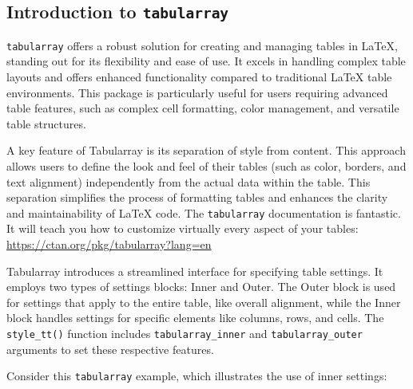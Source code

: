 \documentclass[
  letterpaper,
  DIV=11,
  numbers=noendperiod]{scrartcl}
\begin{document}
\subsection{\texorpdfstring{Introduction to
\texttt{tabularray}}{Introduction to tabularray}}\label{introduction-to-tabularray}

\texttt{tabularray} offers a robust solution for creating and managing
tables in LaTeX, standing out for its flexibility and ease of use. It
excels in handling complex table layouts and offers enhanced
functionality compared to traditional LaTeX table environments. This
package is particularly useful for users requiring advanced table
features, such as complex cell formatting, color management, and
versatile table structures.

A key feature of Tabularray is its separation of style from content.
This approach allows users to define the look and feel of their tables
(such as color, borders, and text alignment) independently from the
actual data within the table. This separation simplifies the process of
formatting tables and enhances the clarity and maintainability of LaTeX
code. The \texttt{tabularray} documentation is fantastic. It will teach
you how to customize virtually every aspect of your tables:
\url{https://ctan.org/pkg/tabularray?lang=en}

Tabularray introduces a streamlined interface for specifying table
settings. It employs two types of settings blocks: Inner and Outer. The
Outer block is used for settings that apply to the entire table, like
overall alignment, while the Inner block handles settings for specific
elements like columns, rows, and cells. The \texttt{style\_tt()}
function includes \texttt{tabularray\_inner} and
\texttt{tabularray\_outer} arguments to set these respective features.

Consider this \texttt{tabularray} example, which illustrates the use of
inner settings:
\end{document}

